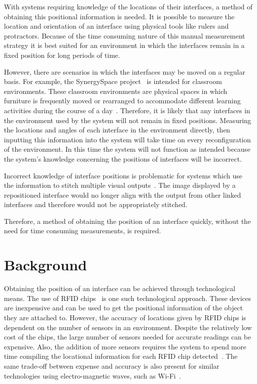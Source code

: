 \documentclass{bmcart}
\begin{document}
With systems requiring knowledge of the locations of their interfaces, a method of obtaining this positional information is needed.
It is possible to measure the location and orientation of an interface using physical tools like rulers and protractors. 
Because of the time consuming nature of this manual measurement strategy it is best suited for an environment in which the interfaces remain in a fixed position for long periods of time.

However, there are scenarios in which the interfaces may be moved on a regular basis.
For example, the SynergySpace project~\cite{Burd2009} is intended for classroom environments.
These classroom environments are physical spaces in which furniture is frequently moved or rearranged to accommodate different learning activities during the course of a day~\cite{Tiburcio2005}.
Therefore, it is likely that any interfaces in the environment used by the system will not remain in fixed positions.
Measuring the locations and angles of each interface in the environment directly, then inputting this information into the system will take time on every reconfiguration of the environment.
In this time the system will not function as intended because the system's knowledge concerning the positions of interfaces will be incorrect.

Incorrect knowledge of interface positions is problematic for systems which use the information to stitch multiple visual outputs~\cite{Dietz2004,Jones2011}.
The image displayed by a repositioned interface would no longer align with the output from other linked interfaces and therefore would not be appropriately stitched.

Therefore, a method of obtaining the position of an interface quickly, without the need for time consuming measurements, is required.


\section*{Background}\label{sec:related}

Obtaining the position of an interface can be achieved through technological means.
The use of RFID chips~\cite{Ni2004} is one such technological approach.
These devices are inexpensive and can be used to get the positional information of the object they are attached to.
However, the accuracy of locations given by RFID chips is dependent on the number of sensors in an environment.
Despite the relatively low cost of the chips, the large number of sensors needed for accurate readings can be expensive.
Also, the addition of more sensors requires the system to spend more time compiling the locational information for each RFID chip detected~\cite{Ni2004}.
The same trade-off between expense and accuracy is also present for similar technologies using electro-magnetic waves, such as Wi-Fi~\cite{Cheng2005}.
\end{document}

